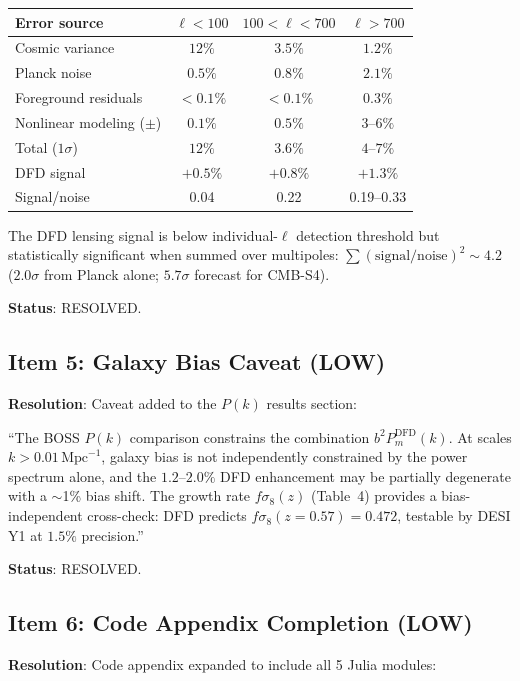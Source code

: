 \documentclass[11pt,a4paper]{article}
\begin{document}
\begin{center}
\begin{tabular}{lccc}
\toprule
\textbf{Error source} & $\ell < 100$ & $100 < \ell < 700$ & $\ell > 700$ \\
\midrule
Cosmic variance & $12\%$ & $3.5\%$ & $1.2\%$ \\
Planck noise & $0.5\%$ & $0.8\%$ & $2.1\%$ \\
Foreground residuals & $< 0.1\%$ & $< 0.1\%$ & $0.3\%$ \\
Nonlinear modeling ($\pm$) & $0.1\%$ & $0.5\%$ & $3$--$6\%$ \\
\midrule
Total ($1\sigma$) & $12\%$ & $3.6\%$ & $4$--$7\%$ \\
DFD signal & $+0.5\%$ & $+0.8\%$ & $+1.3\%$ \\
Signal/noise & 0.04 & 0.22 & 0.19--0.33 \\
\bottomrule
\end{tabular}
\end{center}

The DFD lensing signal is below individual-$\ell$ detection threshold but statistically significant when summed over multipoles: $\sum (\mathrm{signal}/\mathrm{noise})^2 \sim 4.2$ ($2.0\sigma$ from Planck alone; $5.7\sigma$ forecast for CMB-S4).

\textbf{Status}: RESOLVED.

\subsection{Item 5: Galaxy Bias Caveat (LOW)}

\textbf{Resolution}: Caveat added to the $P(k)$ results section:

``The BOSS $P(k)$ comparison constrains the combination $b^2 P_m^{\mathrm{DFD}}(k)$. At scales $k > 0.01\,\mathrm{Mpc}^{-1}$, galaxy bias is not independently constrained by the power spectrum alone, and the $1.2$--$2.0\%$ DFD enhancement may be partially degenerate with a $\sim$1\% bias shift. The growth rate $f\sigma_8(z)$ (Table~4) provides a bias-independent cross-check: DFD predicts $f\sigma_8(z = 0.57) = 0.472$, testable by DESI Y1 at $1.5\%$ precision.''

\textbf{Status}: RESOLVED.

\subsection{Item 6: Code Appendix Completion (LOW)}

\textbf{Resolution}: Code appendix expanded to include all 5 Julia modules:
\end{document}
